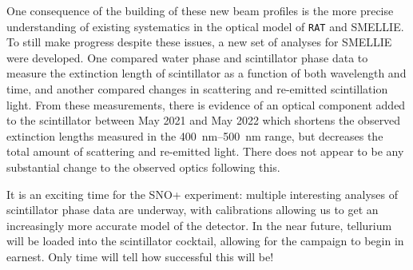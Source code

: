 One consequence of the building of these new beam profiles is the more precise understanding of existing systematics in the optical model of \texttt{RAT} and SMELLIE. To still make progress despite these issues, a new set of analyses for SMELLIE were developed. One compared water phase and scintillator phase data to measure the extinction length of scintillator as a function of both wavelength and time, and another compared changes in scattering and re-emitted scintillation light. From these measurements, there is evidence of an optical component added to the scintillator between May 2021 and May 2022 which shortens the observed extinction lengths measured in the \SIrange{400}{500}{\nm} range, but decreases the total amount of scattering and re-emitted light. There does not appear to be any substantial change to the observed optics following this.

It is an exciting time for the SNO+ experiment: multiple interesting analyses of scintillator phase data are underway, with calibrations allowing us to get an increasingly more accurate model of the detector. In the near future, tellurium will be loaded into the scintillator cocktail, allowing for the \onbb{} campaign to begin in earnest. Only time will tell how successful this will be!

